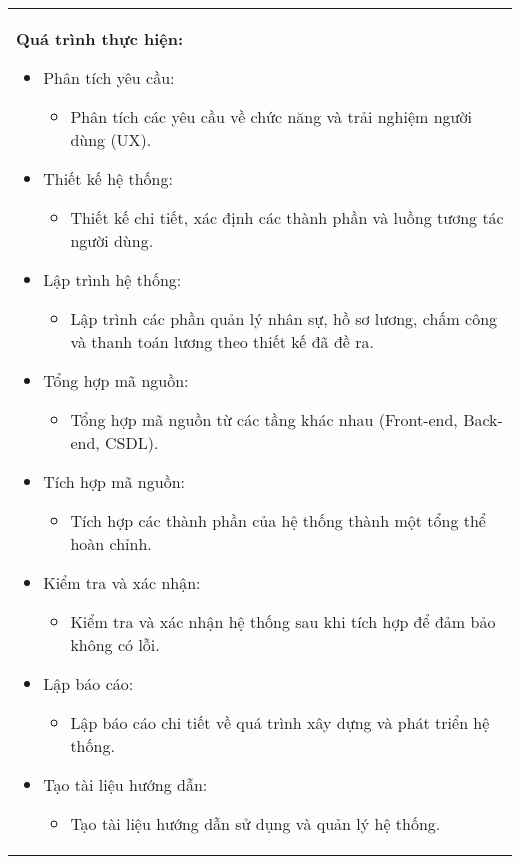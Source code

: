 \begin{longtable}{|p{\textwidth}|}
    \hline
    \begin{minipage}{\textwidth}
        \noindent\textbf{Quá trình thực hiện:}
        \begin{itemize}
            \item Phân tích yêu cầu:
                  \begin{itemize}
                      \item Phân tích các yêu cầu về chức năng và trải nghiệm người dùng (UX).
                  \end{itemize}
            \item Thiết kế hệ thống:
                  \begin{itemize}
                      \item Thiết kế chi tiết, xác định các thành phần và luồng tương tác người dùng.
                  \end{itemize}
            \item Lập trình hệ thống:
                  \begin{itemize}
                      \item Lập trình các phần quản lý nhân sự, hồ sơ lương, chấm công và thanh toán lương theo thiết kế đã đề ra.
                  \end{itemize}
            \item Tổng hợp mã nguồn:
                  \begin{itemize}
                      \item Tổng hợp mã nguồn từ các tầng khác nhau (Front-end, Back-end, CSDL).
                  \end{itemize}
            \item Tích hợp mã nguồn:
                  \begin{itemize}
                      \item Tích hợp các thành phần của hệ thống thành một tổng thể hoàn chỉnh.
                  \end{itemize}
            \item Kiểm tra và xác nhận:
                  \begin{itemize}
                      \item Kiểm tra và xác nhận hệ thống sau khi tích hợp để đảm bảo không có lỗi.
                  \end{itemize}
            \item Lập báo cáo:
                  \begin{itemize}
                      \item Lập báo cáo chi tiết về quá trình xây dựng và phát triển hệ thống.
                  \end{itemize}
            \item Tạo tài liệu hướng dẫn:
                  \begin{itemize}
                      \item Tạo tài liệu hướng dẫn sử dụng và quản lý hệ thống.
                  \end{itemize}
        \end{itemize}


\end{minipage}
\end{longtable}
